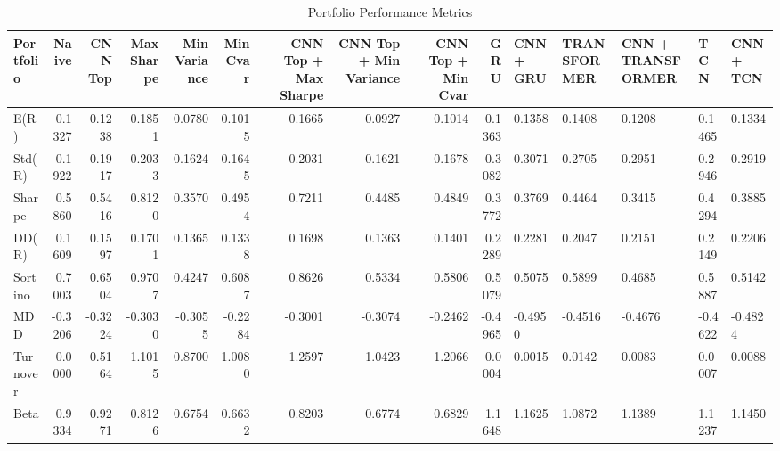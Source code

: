 \begin{table}[htbp]
\centering
\caption{Portfolio Performance Metrics}
\begin{tabular}{lrrrrrrrrr}
\hline
Portfolio & Naive & CNN Top & Max Sharpe & Min Variance & Min Cvar & CNN Top + Max Sharpe & CNN Top + Min Variance & CNN Top + Min Cvar & GRU & CNN + GRU & TRANSFORMER & CNN + TRANSFORMER & TCN & CNN + TCN \\
\hline
E(R) & 0.1327 & 0.1238 & 0.1851 & 0.0780 & 0.1015 & 0.1665 & 0.0927 & 0.1014 & 0.1363 & 0.1358 & 0.1408 & 0.1208 & 0.1465 & 0.1334 \\
Std(R) & 0.1922 & 0.1917 & 0.2033 & 0.1624 & 0.1645 & 0.2031 & 0.1621 & 0.1678 & 0.3082 & 0.3071 & 0.2705 & 0.2951 & 0.2946 & 0.2919 \\
Sharpe & 0.5860 & 0.5416 & 0.8120 & 0.3570 & 0.4954 & 0.7211 & 0.4485 & 0.4849 & 0.3772 & 0.3769 & 0.4464 & 0.3415 & 0.4294 & 0.3885 \\
DD(R) & 0.1609 & 0.1597 & 0.1701 & 0.1365 & 0.1338 & 0.1698 & 0.1363 & 0.1401 & 0.2289 & 0.2281 & 0.2047 & 0.2151 & 0.2149 & 0.2206 \\
Sortino & 0.7003 & 0.6504 & 0.9707 & 0.4247 & 0.6087 & 0.8626 & 0.5334 & 0.5806 & 0.5079 & 0.5075 & 0.5899 & 0.4685 & 0.5887 & 0.5142 \\
MDD & -0.3206 & -0.3224 & -0.3030 & -0.3055 & -0.2284 & -0.3001 & -0.3074 & -0.2462 & -0.4965 & -0.4950 & -0.4516 & -0.4676 & -0.4622 & -0.4824 \\
Turnover & 0.0000 & 0.5164 & 1.1015 & 0.8700 & 1.0080 & 1.2597 & 1.0423 & 1.2066 & 0.0004 & 0.0015 & 0.0142 & 0.0083 & 0.0007 & 0.0088 \\
Beta & 0.9334 & 0.9271 & 0.8126 & 0.6754 & 0.6632 & 0.8203 & 0.6774 & 0.6829 & 1.1648 & 1.1625 & 1.0872 & 1.1389 & 1.1237 & 1.1450 \\
\hline
\end{tabular}
\end{table}